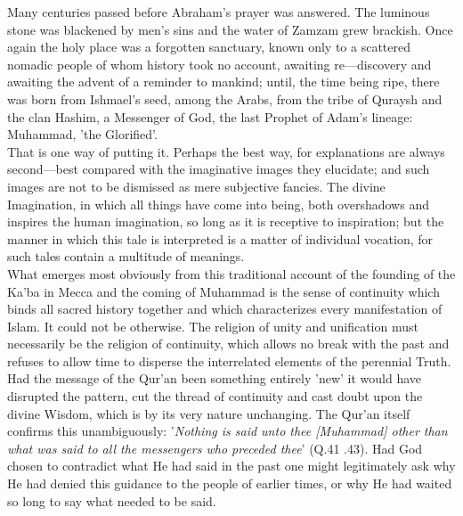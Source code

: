\documentclass[11pt, b5paper, twoside]{book}
\begin{document}
Many centuries passed before Abraham's prayer was answered. The luminous stone was blackened by men's sins and the water of Zamzam grew brackish. Once again the holy place was a forgotten sanctuary, 
known only to a scattered nomadic people of whom history took no account, awaiting re---discovery and 
awaiting the advent of a reminder to mankind; until, the time being ripe, there was born from 
Ishmael's seed, among the Arabs, from the tribe of Quraysh and the clan Hashim, a Messenger of God, 
the last Prophet of Adam's lineage: Muhammad, 'the Glorified'. \\

That is one way of putting it. Perhaps the best way, for explanations are always second---best compared 
with the imaginative images they elucidate; and such images are not to be dismissed as mere 
subjective fancies. The divine Imagination, in which all things have come into being, both 
overshadows and inspires the human imagination, so long as it is receptive to inspiration; but the 
manner in which this tale is interpreted is a matter of individual vocation, for such tales contain a 
multitude of meanings. \\

What emerges most obviously from this traditional account of the founding of the Ka'ba in Mecca and 
the coming of Muhammad is the sense of continuity which binds all sacred history together and which 
characterizes every manifestation of Islam. It could not be otherwise. The religion of unity and 
unification must necessarily be the religion of continuity, which allows no break with the past and 
refuses to allow time to disperse the interrelated elements of the perennial Truth. Had the message 
of the Qur'an been something entirely 'new' it would have disrupted the pattern, cut the thread of 
continuity and cast doubt upon the divine Wisdom, which is by its very nature unchanging. The Qur'an 
itself confirms this unambiguously: '\emph{Nothing is said unto thee [Muhammad] other than what was said to all the messengers who preceded thee}' (Q.41 .43). Had God chosen to contradict what He had said in the past one might legitimately ask why He had denied this guidance to the people of earlier times, 
or why He had waited so long to say what needed to be said. \\
\end{document}
